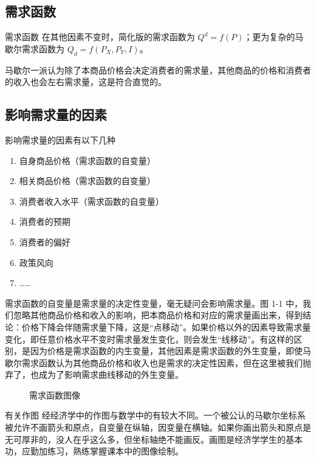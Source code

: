 \subsection{需求函数}

\begin{definition}{需求函数}
    在其他因素不变时，简化版的需求函数为 $Q^d=f\left(P\right)$；更为复杂的马歇尔需求函数为 $Q_d=f\left(P_X,P_Y,I\right)$。
\end{definition}

马歇尔一派认为除了本商品价格会决定消费者的需求量，其他商品的价格和消费者的收入也会左右需求量，这是符合直觉的。

\subsection{影响需求量的因素}

影响需求量的因素有以下几种
\begin{enumerate}
    \item 自身商品价格（需求函数的自变量）
    \item 相关商品价格（需求函数的自变量）
    \item 消费者收入水平（需求函数的自变量）
    \item 消费者的预期
    \item 消费者的偏好
    \item 政策风向
    \item ……
\end{enumerate}

需求函数的自变量是需求量的决定性变量，毫无疑问会影响需求量。图 1-1 中，我们忽略其他商品价格和收入的影响，把本商品价格和对应的需求量画出来，得到结论：价格下降会伴随需求量下降，这是“点移动”。如果价格以外的因素导致需求量变化，即任意价格水平不变时需求量发生变化，则会发生“线移动”。有这样的区别，是因为价格是需求函数的内生变量，其他因素是需求函数的外生变量，即使马歇尔需求函数认为其他商品价格和收入也是需求的决定性因素，但在这里被我们抛弃了，也成为了影响需求曲线移动的外生变量。

\begin{figure}[H]
    \centering
    \caption{需求函数图像}
\end{figure}

\begin{experience}{有关作图}
    经经济学中的作图与数学中的有较大不同。一个被公认的马歇尔坐标系被允许不画箭头和原点，自变量在纵轴，因变量在横轴。如果你画出箭头和原点是无可厚非的，没人在乎这么多，但坐标轴绝不能画反。画图是经济学学生的基本功，应勤加练习，熟练掌握课本中的图像绘制。
\end{experience}